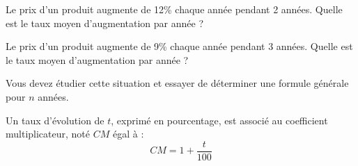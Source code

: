 \documentclass[10pt]{article}
\begin{document}
\begin{Sit}
Le prix d'un produit augmente de 12\% chaque année pendant 2 années. Quelle est le taux moyen d'augmentation par année ?

Le prix d'un produit augmente de 9\% chaque année pendant 3 années. Quelle est le taux moyen d'augmentation par année ?

Vous devez étudier cette situation et essayer de déterminer une formule générale pour $n$ années.  
\end{Sit}

\begin{Rap}

Un taux d'évolution de $t$, exprimé en pourcentage, est associé au coefficient multiplicateur, noté $CM$ égal à : $$CM=1+\frac{t}{100}$$

\end{Rap}






  
 


 
 
%
% 
\end{document}
